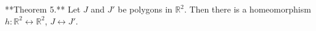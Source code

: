 **Theorem 5.** Let $J$ and $J'$ be polygons in $\mathbb{R}^2$. Then there is a homeomorphism $h: \mathbb{R}^2 \leftrightarrow \mathbb{R}^2$, $J \leftrightarrow J'$.
